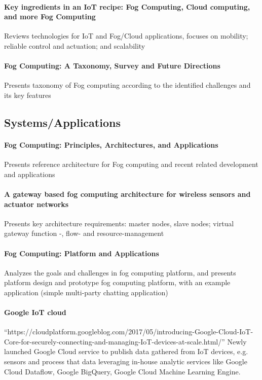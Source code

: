 \paragraph{Key ingredients in an IoT recipe: Fog Computing, Cloud computing, and more Fog Computing}\cite{yannuzzi_key_2014}
Reviews technologies for IoT and Fog/Cloud applications, focuses on mobility; reliable control and actuation; and scalability

\paragraph{Fog Computing: A Taxonomy, Survey and Future Directions}\cite{mahmud_fog_2016}
Presents taxonomy of Fog computing according to the identified challenges and its key features


\subsection{Systems/Applications}

\paragraph{Fog Computing: Principles, Architectures, and Applications}\cite{dastjerdi_fog_2016}
Presents reference architecture for Fog computing and recent related development and applications

\paragraph{A gateway based fog computing architecture for wireless sensors and actuator networks \cite{7423332}}
Presents key architecture requirements: master nodes, slave nodes; virtual gateway function -, flow- and resource-management


\paragraph{Fog Computing: Platform and Applications} \cite{yi_fog_2015}
Analyzes the goals and challenges in fog computing platform, and presents platform design and prototype fog computing platform, with an example application (simple multi-party chatting application)

\paragraph{Google IoT cloud}
``https://cloudplatform.googleblog.com/2017/05/introducing-Google-Cloud-IoT-Core-for-securely-connecting-and-managing-IoT-devices-at-scale.html/'' Newly launched Google Cloud service to publish data gathered from IoT devices, e.g. sensors and process that data leveraging in-house analytic services like Google Cloud Dataflow, Google BigQuery, Google Cloud Machine Learning Engine.

